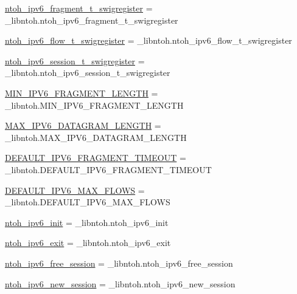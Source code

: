 \begin{DoxyCompactItemize}
\item 
\hyperlink{namespacelibntoh_a2f391b95631d6ab1238042e33d71c1db}{ntoh\-\_\-ipv6\-\_\-fragment\-\_\-t\-\_\-swigregister} = \-\_\-libntoh.\-ntoh\-\_\-ipv6\-\_\-fragment\-\_\-t\-\_\-swigregister
\item 
\hyperlink{namespacelibntoh_a623c8d1c690056fbb43b6012c2d64dc1}{ntoh\-\_\-ipv6\-\_\-flow\-\_\-t\-\_\-swigregister} = \-\_\-libntoh.\-ntoh\-\_\-ipv6\-\_\-flow\-\_\-t\-\_\-swigregister
\item 
\hyperlink{namespacelibntoh_a75195302d0e2d92ba46a7cb3841ce2ae}{ntoh\-\_\-ipv6\-\_\-session\-\_\-t\-\_\-swigregister} = \-\_\-libntoh.\-ntoh\-\_\-ipv6\-\_\-session\-\_\-t\-\_\-swigregister
\item 
\hyperlink{namespacelibntoh_ab1cf805b007e1d4553c1dace792e7a07}{M\-I\-N\-\_\-\-I\-P\-V6\-\_\-\-F\-R\-A\-G\-M\-E\-N\-T\-\_\-\-L\-E\-N\-G\-T\-H} = \-\_\-libntoh.\-M\-I\-N\-\_\-\-I\-P\-V6\-\_\-\-F\-R\-A\-G\-M\-E\-N\-T\-\_\-\-L\-E\-N\-G\-T\-H
\item 
\hyperlink{namespacelibntoh_a061975987ca374431d72db176e286d28}{M\-A\-X\-\_\-\-I\-P\-V6\-\_\-\-D\-A\-T\-A\-G\-R\-A\-M\-\_\-\-L\-E\-N\-G\-T\-H} = \-\_\-libntoh.\-M\-A\-X\-\_\-\-I\-P\-V6\-\_\-\-D\-A\-T\-A\-G\-R\-A\-M\-\_\-\-L\-E\-N\-G\-T\-H
\item 
\hyperlink{namespacelibntoh_a48aa3979830d824db5ae0119843cb508}{D\-E\-F\-A\-U\-L\-T\-\_\-\-I\-P\-V6\-\_\-\-F\-R\-A\-G\-M\-E\-N\-T\-\_\-\-T\-I\-M\-E\-O\-U\-T} = \-\_\-libntoh.\-D\-E\-F\-A\-U\-L\-T\-\_\-\-I\-P\-V6\-\_\-\-F\-R\-A\-G\-M\-E\-N\-T\-\_\-\-T\-I\-M\-E\-O\-U\-T
\item 
\hyperlink{namespacelibntoh_ad45951b70a3812f517f374be95af60c0}{D\-E\-F\-A\-U\-L\-T\-\_\-\-I\-P\-V6\-\_\-\-M\-A\-X\-\_\-\-F\-L\-O\-W\-S} = \-\_\-libntoh.\-D\-E\-F\-A\-U\-L\-T\-\_\-\-I\-P\-V6\-\_\-\-M\-A\-X\-\_\-\-F\-L\-O\-W\-S
\item 
\hyperlink{namespacelibntoh_ad8c16993a5b572e131b7c0936e1909d9}{ntoh\-\_\-ipv6\-\_\-init} = \-\_\-libntoh.\-ntoh\-\_\-ipv6\-\_\-init
\item 
\hyperlink{namespacelibntoh_ac3dc47de40c82fba6f77c99003751cce}{ntoh\-\_\-ipv6\-\_\-exit} = \-\_\-libntoh.\-ntoh\-\_\-ipv6\-\_\-exit
\item 
\hyperlink{namespacelibntoh_aa375f0ac6bebe31c151eb0893990fa2c}{ntoh\-\_\-ipv6\-\_\-free\-\_\-session} = \-\_\-libntoh.\-ntoh\-\_\-ipv6\-\_\-free\-\_\-session
\item 
\hyperlink{namespacelibntoh_ad00e325a03337be21874370198d0540e}{ntoh\-\_\-ipv6\-\_\-new\-\_\-session} = \-\_\-libntoh.\-ntoh\-\_\-ipv6\-\_\-new\-\_\-session

\end{DoxyCompactItemize}

